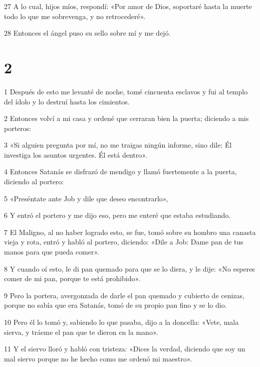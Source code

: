 \par 27 A lo cual, hijos míos, respondí: «Por amor de Dios, soportaré hasta la muerte todo lo que me sobrevenga, y no retrocederé».

\par 28 Entonces el ángel puso su sello sobre mí y me dejó.

\chapter{2}

\par 1 Después de esto me levanté de noche, tomé cincuenta esclavos y fui al templo del ídolo y lo destruí hasta los cimientos.

\par 2 Entonces volví a mi casa y ordené que cerraran bien la puerta; diciendo a mis porteros:

\par 3 «Si alguien pregunta por mí, no me traigas ningún informe, sino dile: Él investiga los asuntos urgentes. Él está dentro».

\par 4 Entonces Satanás se disfrazó de mendigo y llamó fuertemente a la puerta, diciendo al portero:

\par 5 «Preséntate ante Job y dile que deseo encontrarlo»,

\par 6 Y entró el portero y me dijo eso, pero me enteré que estaba estudiando.

\par 7 El Maligno, al no haber logrado esto, se fue, tomó sobre su hombro una canasta vieja y rota, entró y habló al portero, diciendo: «Dile a Job: Dame pan de tus manos para que pueda comer».

\par 8 Y cuando oí esto, le di pan quemado para que se lo diera, y le dije: «No esperes comer de mi pan, porque te está prohibido».

\par 9 Pero la portera, avergonzada de darle el pan quemado y cubierto de cenizas, porque no sabía que era Satanás, tomó de su propio pan fino y se lo dio.

\par 10 Pero él lo tomó y, sabiendo lo que pasaba, dijo a la doncella: «Vete, mala sierva, y tráeme el pan que te dieron en la mano».

\par 11 Y el siervo lloró y habló con tristeza: «Dices la verdad, diciendo que soy un mal siervo porque no he hecho como me ordenó mi maestro».


